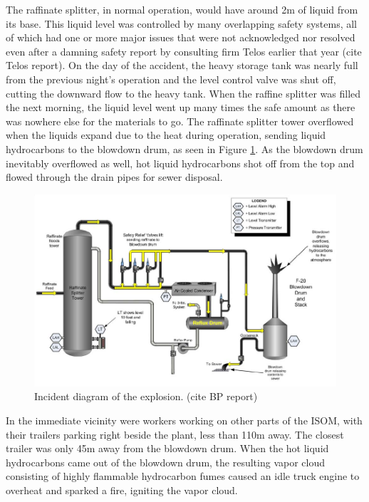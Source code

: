 \documentclass[12pt]{article}
\begin{document}
	The raffinate splitter, in normal operation, would have around 2m of liquid from its base. This liquid level was controlled by many overlapping safety systems, all of which had one or more major issues that were not acknowledged nor resolved even after a damning safety report by consulting firm Telos earlier that year (cite Telos report). On the day of the accident, the heavy storage tank was nearly full from the previous night's operation and the level control valve was shut off, cutting the downward flow to the heavy tank. When the raffine splitter was filled the next morning, the liquid level went up many times the safe amount as there was nowhere else for the materials to go. The raffinate splitter tower overflowed when the liquids expand due to the heat during operation, sending liquid hydrocarbons to the blowdown drum, as seen in Figure \ref{fig:incidentdiagram}. As the blowdown drum inevitably overflowed as well, hot liquid hydrocarbons shot off from the top and flowed through the drain pipes for sewer disposal.
	
	\begin{figure}[H]

		\includegraphics[width=\textwidth]{BP_Texas_City_incident_diagram.png}
		\caption{Incident diagram of the explosion. (cite BP report)}
		\label{fig:incidentdiagram}
	\end{figure}
	In the immediate vicinity were workers working on other parts of the ISOM, with their trailers parking right beside the plant, less than 110m away. The closest trailer was only 45m away from the blowdown drum. When the hot liquid hydrocarbons came out of the blowdown drum, the resulting vapor cloud consisting of highly flammable hydrocarbon fumes caused an idle truck engine to overheat and sparked a fire, igniting the vapor cloud. 
	
\end{document}
